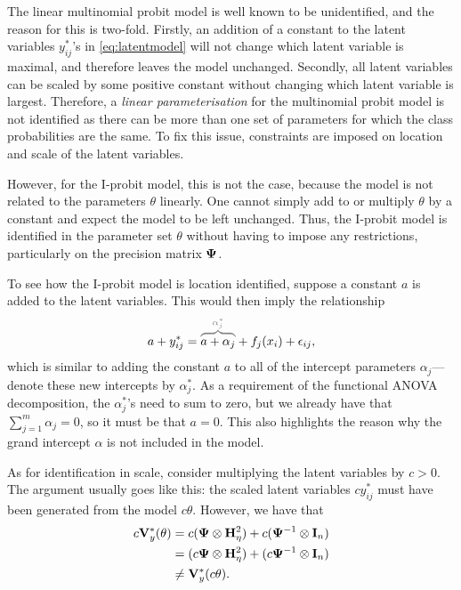 The linear multinomial probit model is well known to be unidentified, and the reason for this is two-fold.
Firstly, an addition of a constant to the latent variables $y_{ij}^*$'s in \cref{eq:latentmodel} will not change which latent variable is maximal, and therefore leaves the model unchanged.
Secondly, all latent variables can be scaled by some positive constant without changing which latent variable is largest.
Therefore, a \emph{linear parameterisation} for the multinomial probit model is not identified as there can be more than one set of parameters for which the class probabilities are the same.
To fix this issue, constraints are imposed on location and scale of the latent variables.

However, for the I-probit model, this is not the case, because the model is not related to the parameters $\theta$ linearly.
One cannot simply add to or multiply $\theta$ by a constant and expect the model to be left unchanged.
Thus, the I-probit model is identified in the parameter set $\theta$ without having to impose any restrictions, particularly on the precision matrix ${\bm\Psi}$.

To see how the I-probit model is location identified, suppose a constant $a$ is added to the latent variables.
This would then imply the relationship
\[
  a + y_{ij}^* = 
  \greyoverbrace{a + \alpha_j}{\alpha_j^*}  + f_j(x_i) + \epsilon_{ij},
\]
which is similar to adding the constant $a$ to all of the intercept parameters $\alpha_j$---denote these new intercepts by $\alpha_j^*$.
As a requirement of the functional ANOVA decomposition, the $\alpha_j^*$'s need to sum to zero, but we already have that $\sum_{j=1}^m \alpha_j=0$, so it must be that $a =0$.
This also highlights the reason why the grand intercept $\alpha$ is not included in the model.

As for identification in scale, consider multiplying the latent variables by $c>0$.
The argument usually goes like this: the scaled latent variables $cy^*_{ij}$ must have been generated from the model $c\theta$.
However, we have that 
\begin{align*}
  c{\mathbf V}_y^*(\theta)
  &= c ({\bm\Psi} \otimes {\mathbf H}_\eta^2) + c ({\bm\Psi}^{-1} \otimes {\mathbf I}_n) \\
  &= (c {\bm\Psi} \otimes {\mathbf H}_\eta^2) + (c {\bm\Psi}^{-1} \otimes {\mathbf I}_n) \\
  &\neq {\mathbf V}_y^*(c\theta).
\end{align*}





